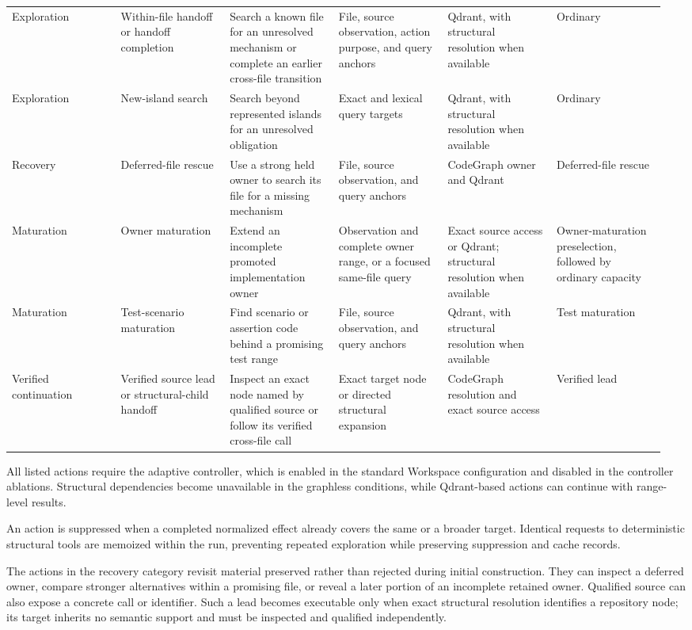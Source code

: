 \begin{landscape}
\begin{longtable}{@{}L{0.16\linewidth}L{0.16\linewidth}L{0.16\linewidth}L{0.16\linewidth}L{0.16\linewidth}L{0.16\linewidth}@{}}
Exploration & Within-file handoff or handoff completion & Search a known file for an unresolved mechanism or complete an earlier cross-file transition & File, source observation, action purpose, and query anchors & Qdrant, with structural resolution when available & Ordinary \\
Exploration & New-island search & Search beyond represented islands for an unresolved obligation & Exact and lexical query targets & Qdrant, with structural resolution when available & Ordinary \\
Recovery & Deferred-file rescue & Use a strong held owner to search its file for a missing mechanism & File, source observation, and query anchors & CodeGraph owner and Qdrant & Deferred-file rescue \\
Maturation & Owner maturation & Extend an incomplete promoted implementation owner & Observation and complete owner range, or a focused same-file query & Exact source access or Qdrant; structural resolution when available & Owner-maturation preselection, followed by ordinary capacity \\
Maturation & Test-scenario maturation & Find scenario or assertion code behind a promising test range & File, source observation, and query anchors & Qdrant, with structural resolution when available & Test maturation \\
Verified continuation & Verified source lead or structural-child handoff & Inspect an exact node named by qualified source or follow its verified cross-file call & Exact target node or directed structural expansion & CodeGraph resolution and exact source access & Verified lead \\
\end{longtable}
\endgroup
\end{landscape}

All listed actions require the adaptive controller, which is enabled in the standard Workspace configuration and disabled in the controller ablations. Structural dependencies become unavailable in the graphless conditions, while Qdrant-based actions can continue with range-level results.

An action is suppressed when a completed normalized effect already covers the same or a broader target. Identical requests to deterministic structural tools are memoized within the run, preventing repeated exploration while preserving suppression and cache records.

The actions in the recovery category revisit material preserved rather than rejected during initial construction. They can inspect a deferred owner, compare stronger alternatives within a promising file, or reveal a later portion of an incomplete retained owner. Qualified source can also expose a concrete call or identifier. Such a lead becomes executable only when exact structural resolution identifies a repository node; its target inherits no semantic support and must be inspected and qualified independently.

